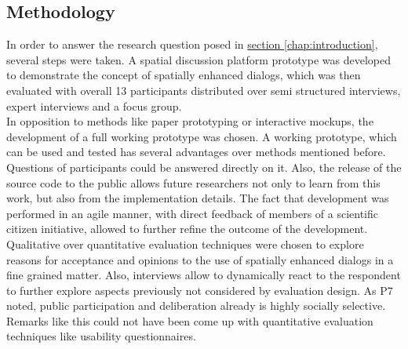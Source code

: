 \subsection{Methodology}
\label{sub:method-discussion}
In order to answer the research question posed in \hyperref[chap:introduction]{section \ref{chap:introduction}}, several steps were taken. A spatial discussion platform prototype was developed to demonstrate the concept of spatially enhanced dialogs, which was then evaluated with overall 13 participants distributed over semi structured interviews, expert interviews and a focus group.\\
In opposition to methods like paper prototyping or interactive mockups, the development of a full working prototype was chosen. A working prototype, which can be used and tested has several advantages over methods mentioned before. Questions of participants could be answered directly on it. Also, the release of the source code to the public allows future researchers not only to learn from this work, but also from the implementation details. The fact that development was performed in an agile manner, with direct feedback of members of a scientific citizen initiative, allowed to further refine the outcome of the development.\\
Qualitative over quantitative evaluation techniques were chosen to explore reasons for acceptance and opinions to the use of spatially enhanced dialogs in a fine grained matter. Also, interviews allow to dynamically react to the respondent to further explore aspects previously not considered by evaluation design. As P7 noted, public participation and deliberation already is highly socially selective. Remarks like this could not have been come up with quantitative evaluation techniques like usability questionnaires.\\

